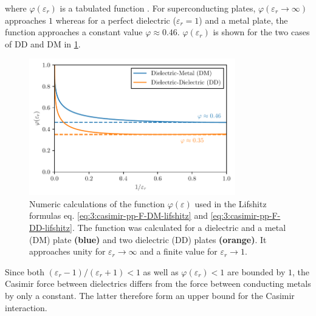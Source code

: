 where $\varphi(\varepsilon_r)$ is a tabulated function \cite{Lifshitz_1956}. 
For superconducting plates, $\varphi(\varepsilon_r \rightarrow \infty)$ approaches $1$ whereas for a perfect dielectric ($\varepsilon_r = 1$) and a metal plate, the function approaches a constant value $\varphi \approx 0.46$.
$\varphi(\varepsilon_r)$ is shown for the two cases of DD and DM in \cref{fig:3:lifshitz-function}.
\begin{figure}[!htbp]
  \centering
  \includegraphics[width=0.8\textwidth]{./../figures/casimir/casimir-lifshitz-function.pdf}
  \caption{Numeric calculations of the function $\varphi(\varepsilon)$ used in the Lifshitz formulas eq. \eqref{eq:3:casimir-pp-F-DM-lifshitz} and \eqref{eq:3:casimir-pp-F-DD-lifshitz}. The function was calculated for a dielectric and a metal (DM) plate \textbf{(blue)} and two dielectric (DD) plates \textbf{(orange)}. It approaches unity for $\varepsilon_r\rightarrow\infty$ and a finite value for $\varepsilon_r\rightarrow 1$.}
  \label{fig:3:lifshitz-function}
\end{figure}
Since both $(\varepsilon_r - 1)/(\varepsilon_r + 1) < 1$ as well as $\varphi(\varepsilon_r) < 1$ are bounded by $1$, the Casimir force between dielectrics differs from the force between conducting metals by only a constant.
The latter therefore form an upper bound for the Casimir interaction.





